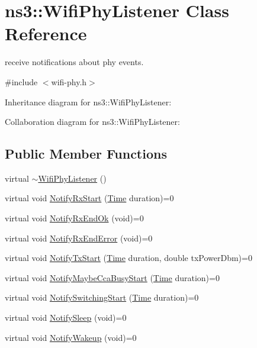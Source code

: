 \hypertarget{classns3_1_1WifiPhyListener}{}\section{ns3\+:\+:Wifi\+Phy\+Listener Class Reference}
\label{classns3_1_1WifiPhyListener}


receive notifications about phy events.  




{\ttfamily \#include $<$wifi-\/phy.\+h$>$}



Inheritance diagram for ns3\+:\+:Wifi\+Phy\+Listener\+:


Collaboration diagram for ns3\+:\+:Wifi\+Phy\+Listener\+:
\subsection*{Public Member Functions}
\begin{DoxyCompactItemize}
\item 
virtual \hyperlink{classns3_1_1WifiPhyListener_a56b7bcce9135ac29050515b7fb1430ab}{$\sim$\+Wifi\+Phy\+Listener} ()
\item 
virtual void \hyperlink{classns3_1_1WifiPhyListener_af4c85874e4b351216c08ff90ca5c0e95}{Notify\+Rx\+Start} (\hyperlink{classns3_1_1Time}{Time} duration)=0
\item 
virtual void \hyperlink{classns3_1_1WifiPhyListener_ad105ffb321929d7b3b88c8368cd927ef}{Notify\+Rx\+End\+Ok} (void)=0
\item 
virtual void \hyperlink{classns3_1_1WifiPhyListener_ad687a6259a54647828fa39a9af155f04}{Notify\+Rx\+End\+Error} (void)=0
\item 
virtual void \hyperlink{classns3_1_1WifiPhyListener_ae9c765ad70d871fc0dbdc31dac0eea12}{Notify\+Tx\+Start} (\hyperlink{classns3_1_1Time}{Time} duration, double tx\+Power\+Dbm)=0
\item 
virtual void \hyperlink{classns3_1_1WifiPhyListener_a6603fe9ddbf94c8c56ba1aa5a24f6c01}{Notify\+Maybe\+Cca\+Busy\+Start} (\hyperlink{classns3_1_1Time}{Time} duration)=0
\item 
virtual void \hyperlink{classns3_1_1WifiPhyListener_a35f8545325778d895e7b00e69f515b60}{Notify\+Switching\+Start} (\hyperlink{classns3_1_1Time}{Time} duration)=0
\item 
virtual void \hyperlink{classns3_1_1WifiPhyListener_ae899b9fdb63dbf965e786146171d3b2a}{Notify\+Sleep} (void)=0
\item 
virtual void \hyperlink{classns3_1_1WifiPhyListener_a02bc92f44d0f770bc0b340e8ebbd6f32}{Notify\+Wakeup} (void)=0
\end{DoxyCompactItemize}


